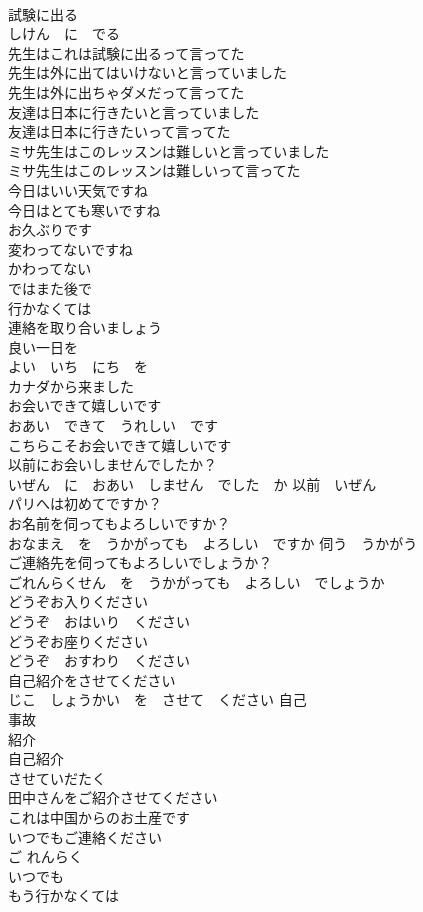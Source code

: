 \documentclass[8pt]{extreport}
\begin{document}
\begin{CJK}{UTF8}{min}
\\	試験に出る 
\\	しけん　に　でる
\\	先生はこれは試験に出るって言ってた	
\\	先生は外に出てはいけないと言っていました	
\\	先生は外に出ちゃダメだって言ってた	
\\	友達は日本に行きたいと言っていました	
\\	友達は日本に行きたいって言ってた	
\\	ミサ先生はこのレッスンは難しいと言っていました	
\\	ミサ先生はこのレッスンは難しいって言ってた	
\\	今日はいい天気ですね	
\\	今日はとても寒いですね	
\\	お久ぶりです	
\\	変わってないですね	
\\	かわってない
\\	ではまた後で	
\\	行かなくては	
\\	連絡を取り合いましょう	
\\	良い一日を	
\\	よい　いち　にち　を
\\	カナダから来ました	
\\	お会いできて嬉しいです	
\\	おあい　できて　うれしい　です
\\	こちらこそお会いできて嬉しいです	
\\	以前にお会いしませんでしたか？	
\\	いぜん　に　おあい　しません　でした　か 以前　いぜん 
\\	パリへは初めてですか？	
\\	お名前を伺ってもよろしいですか？	
\\	おなまえ　を　うかがっても　よろしい　ですか 伺う　うかがう　
\\	ご連絡先を伺ってもよろしいでしょうか？	
\\	ごれんらくせん　を　うかがっても　よろしい　でしょうか
\\	どうぞお入りください	
\\	どうぞ　おはいり　ください
\\	どうぞお座りください	
\\	どうぞ　おすわり　ください
\\	自己紹介をさせてください	
\\	じこ　しょうかい　を　させて　ください 自己 
\\	事故 
\\	紹介 
\\	自己紹介 
\\	させていだたく 
\\	田中さんをご紹介させてください	
\\	これは中国からのお土産です	
\\	いつでもご連絡ください	
\\	ご れんらく 
\\	いつでも 
\\	もう行かなくては	
\end{CJK}
\end{document}
